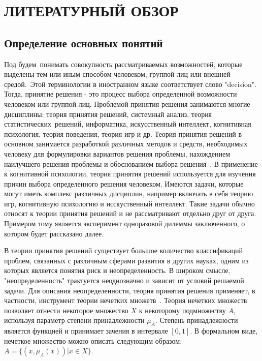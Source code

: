 \chapter{ЛИТЕРАТУРНЫЙ ОБЗОР}
\section{Определение основных понятий}

Под \grqq{ } будем~понимать совокупность рассматриваемых возможностей, которые выделены тем
или иным способом человеком, группой лиц или внешней средой.~Этой терминологии в иностранном языке
соответствует слово "decision".
Тогда, принятие решения - это процесс выбора определенной возможности человеком или группой лиц.
Проблемой принятия решения занимаются многие дисциплины: теория принятия решений, системный анализ,
теория статистических~решений, информатика, искусственный интеллект, когнитивная психология, теория
поведения, теория игр и др.
Теория принятия решений в основном занимается разработкой различных методов и средств, необходимых
человеку для формулировки вариантов решения проблемы, нахождением наилучшего решения проблемы и
обоснованием выбора решения~\citep{petrovsky2009theory}.
В применение к когнитивной психологии, теория принятия решений используется для изучения причин выбора
определенного решения человеком.
Имеются задачи, которые могут иметь комплекс различных дисциплин, например включать в себя теорию игр,
когнитивную психологию и исскуственный интеллект.
Такие задачи обычно относят к теории принятия решений и не рассматривают отдельно друг от друга.
Примером тому является эксперимент одноразовой дилеммы заключенного, о котором будет рассказано далее.

В теории принятия решений существует большое количество классификаций проблем, связанных с различным
сферами развития в других науках, одним из которых является понятия риск и неопределенность.
В широком смысле, "неопределенность" трактуется неоднозначно и зависит от условий решаемой задачи.
Для описания неопределенности, теория принятия решения применяет, в частности, инструмент теории
нечетких множетв~\citep{demidiva2012decision}. Теория нечетких множеств позволяет отнести некоторое
множество $X$ к некоторому подмножеству $A$, используя параметр степени принадлежности $\mu_{A}$.
Степень принадлежности является функцией и принимает зачения в интервале $[0,1]$.
В формальном виде, нечеткое множество можно описать следующим образом: $A = \{(x,\mu_{A}(x)) | x \in X\}$.

